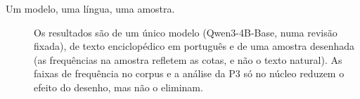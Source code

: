 \begin{description}
    \item[Um modelo, uma língua, uma amostra.] Os resultados são de um único modelo
    (Qwen3-4B-Base, numa revisão fixada), de texto enciclopédico em português e de uma amostra
    desenhada (as frequências na amostra refletem as cotas, e não o texto natural). As faixas
    de frequência no corpus e a análise da P3 só no núcleo reduzem o efeito do desenho, mas
    não o eliminam.
\end{description}
